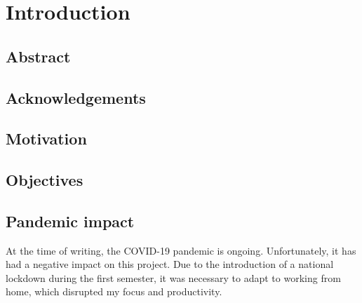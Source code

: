 \documentclass[../../report.tex]{subfiles}
\begin{document}
\chapter{Introduction}

\section{Abstract}

\section{Acknowledgements}
\section{Motivation}
\section{Objectives}
\section{Pandemic impact}
At the time of writing, the COVID-19 pandemic is ongoing. Unfortunately, it has had a negative impact on this project. Due to the introduction of a national lockdown during the first semester, it was necessary to adapt to working from home, which disrupted my focus and productivity.
\end{document}
